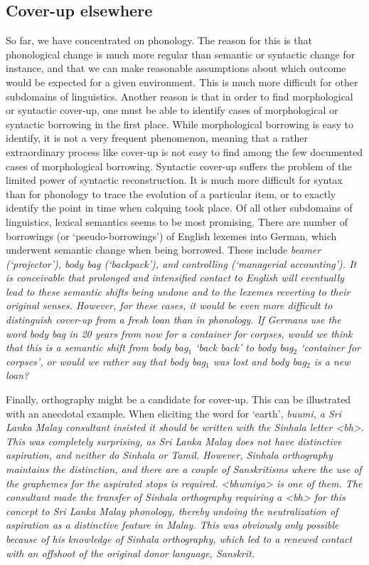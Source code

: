 \documentclass[a4paper,10pt]{article}
\newcommand{\graphem}[1]{<#1>}
\newcommand{\trs}[2]{\textit{#1} `#2'}
\begin{document}
\subsection{Cover-up elsewhere}
So far, we have concentrated on phonology. The reason for this is that phonological change is much more regular than semantic or syntactic change for instance, and that we can make reasonable assumptions about which outcome would be expected for a given environment. This is much more difficult for other subdomains of linguistics. Another reason is that in order to find morphological or syntactic cover-up, one must be able to identify cases of morphological or syntactic borrowing in the first place. While morphological borrowing is easy to identify, it is not a very frequent phenomenon, meaning that a rather extraordinary process like cover-up is not easy to find among the few documented cases of morphological borrowing. Syntactic cover-up suffers the problem of the limited power of syntactic reconstruction. It is much more difficult for syntax than for phonology to trace the evolution of a particular item, or to exactly identify the point in time when calquing took place.
Of all other subdomains of linguistics, lexical semantics seems to be most promising. There are number of borrowings (or `pseudo-borrowings') of English lexemes into German, which underwent semantic change when being borrowed. These include \em beamer \em (`projector'), \em body bag \em (`backpack'), and \em controlling \em (`managerial accounting'). It is conceivable that prolonged and intensified contact to English will eventually lead to these semantic shifts being undone and to the lexemes reverting to their original senses.
However, for these cases, it would be even more difficult to distinguish cover-up from a fresh loan than in phonology. If Germans use the word \em body bag \em in 20 years from now for a container for corpses, would we think that this is a semantic shift from \trs{body bag$_{1}$}{back back} to \trs{body bag$_{2}$}{container for corpses}, or would we rather say that \em body bag$_{1}$ \em was lost and \em body bag$_{2}$ \em is a new loan?

Finally, orthography might be a candidate for cover-up. This can be illustrated with an anecdotal example. When eliciting the word for `earth', \em buumi\em, a Sri Lanka Malay consultant insisted it should be written with the Sinhala letter \graphem{bh}. This was completely surprising, as Sri Lanka Malay does not have distinctive aspiration, and neither do Sinhala or Tamil. However, Sinhala orthography maintains the distinction, and there are a couple of Sanskritisms where the use of the graphemes for the aspirated stops is required. \graphem{bhumiya} is one of them. The consultant made the transfer of Sinhala orthography requiring a \graphem{bh} for this concept to Sri Lanka Malay phonology, thereby undoing the neutralization of aspiration as a distinctive feature in Malay. This was obviously only possible because of his knowledge of Sinhala orthography, which led to a renewed contact with an offshoot of the original donor language, Sanskrit.
\end{document}
